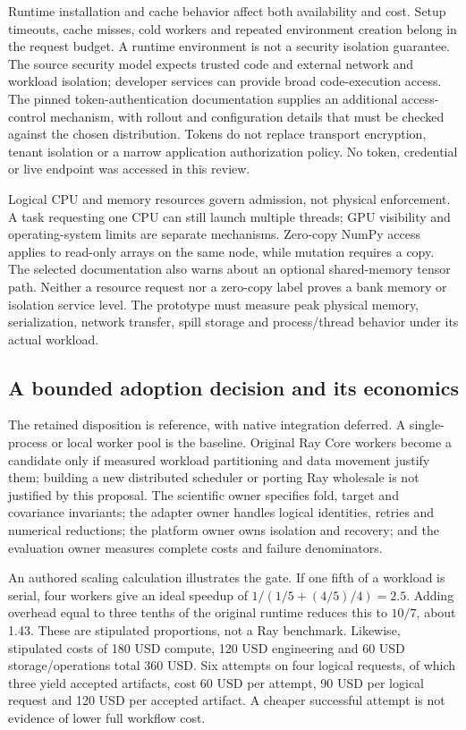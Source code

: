 Runtime installation and cache behavior affect both availability and cost. Setup timeouts, cache misses, cold workers and repeated environment creation belong in the request budget. A runtime environment is not a security isolation guarantee. The source security model expects trusted code and external network and workload isolation; developer services can provide broad code-execution access. The pinned token-authentication documentation supplies an additional access-control mechanism, with rollout and configuration details that must be checked against the chosen distribution. Tokens do not replace transport encryption, tenant isolation or a narrow application authorization policy. No token, credential or live endpoint was accessed in this review.~\citep{exec24_ray_sources}

Logical CPU and memory resources govern admission, not physical enforcement. A task requesting one CPU can still launch multiple threads; GPU visibility and operating-system limits are separate mechanisms. Zero-copy NumPy access applies to read-only arrays on the same node, while mutation requires a copy. The selected documentation also warns about an optional shared-memory tensor path. Neither a resource request nor a zero-copy label proves a bank memory or isolation service level. The prototype must measure peak physical memory, serialization, network transfer, spill storage and process/thread behavior under its actual workload.~\citep{exec24_ray_sources}

\subsection{A bounded adoption decision and its economics}
The retained disposition is reference, with native integration deferred. A single-process or local worker pool is the baseline. Original Ray Core workers become a candidate only if measured workload partitioning and data movement justify them; building a new distributed scheduler or porting Ray wholesale is not justified by this proposal. The scientific owner specifies fold, target and covariance invariants; the adapter owner handles logical identities, retries and numerical reductions; the platform owner owns isolation and recovery; and the evaluation owner measures complete costs and failure denominators.~\citep{exec24_ray_contract}

An authored scaling calculation illustrates the gate. If one fifth of a workload is serial, four workers give an ideal speedup of $1/(1/5+(4/5)/4)=2.5$. Adding overhead equal to three tenths of the original runtime reduces this to $10/7$, about 1.43. These are stipulated proportions, not a Ray benchmark. Likewise, stipulated costs of 180 USD compute, 120 USD engineering and 60 USD storage/operations total 360 USD. Six attempts on four logical requests, of which three yield accepted artifacts, cost 60 USD per attempt, 90 USD per logical request and 120 USD per accepted artifact. A cheaper successful attempt is not evidence of lower full workflow cost.~\citep{exec24_ray_contract}

